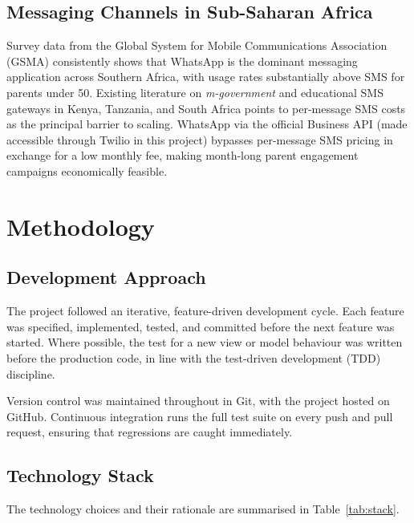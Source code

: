 \documentclass[11pt,a4paper]{article}
\begin{document}
\subsection{Messaging Channels in Sub-Saharan Africa}

Survey data from the Global System for Mobile Communications Association
(GSMA) consistently shows that WhatsApp is the dominant messaging application
across Southern Africa, with usage rates substantially above SMS for parents
under 50. Existing literature on \textit{m-government} and educational SMS
gateways in Kenya, Tanzania, and South Africa points to per-message
SMS costs as the principal barrier to scaling. WhatsApp via the official
Business API (made accessible through Twilio in this project) bypasses
per-message SMS pricing in exchange for a low monthly fee, making
month-long parent engagement campaigns economically feasible.

\section{Methodology}

\subsection{Development Approach}

The project followed an iterative, feature-driven development cycle. Each
feature was specified, implemented, tested, and committed before the next
feature was started. Where possible, the test for a new view or model
behaviour was written before the production code, in line with the
test-driven development (TDD) discipline.

Version control was maintained throughout in Git, with the project hosted on
GitHub. Continuous integration runs the full test suite on every push and
pull request, ensuring that regressions are caught immediately.

\subsection{Technology Stack}

The technology choices and their rationale are summarised in
Table~\ref{tab:stack}.
\end{document}

